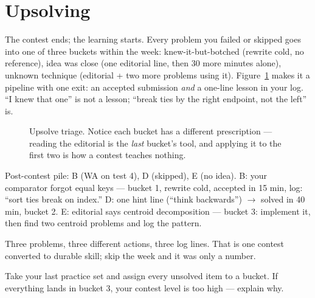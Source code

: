 \section{Upsolving}\label{sec:upsolve}
The contest ends; the learning starts. Every problem you
failed or skipped goes into one of three buckets within the
week: knew-it-but-botched (rewrite cold, no reference), idea
was close (one editorial line, then 30 more minutes alone),
unknown technique (editorial + two more problems using it).
Figure~\ref{fig:upsolve} makes it a pipeline with one exit:
an accepted submission \emph{and} a one-line lesson in your
log. ``I knew that one'' is not a lesson; ``break ties by the
right endpoint, not the left'' is.
\begin{figure}[ht]\centering

\caption{Upsolve triage. Notice each bucket has a different
prescription --- reading the editorial is the \emph{last}
bucket's tool, and applying it to the first two is how a
contest teaches nothing.}
\label{fig:upsolve}
\end{figure}

\begin{example}
Post-contest pile: B (WA on test 4), D (skipped), E (no idea).
B: your comparator forgot equal keys --- bucket 1, rewrite
cold, accepted in 15 min, log: ``sort ties break on index.''
D: one hint line (``think backwards'') $\to$ solved in 40 min,
bucket 2. E: editorial says centroid decomposition --- bucket
3: implement it, then find two centroid problems and log the
pattern.
\end{example}
\begin{solution}
Three problems, three different actions, three log lines.
That is one contest converted to durable skill; skip the week
and it was only a number.
\end{solution}

\begin{exercise}[easy] Take your last practice set and assign
every unsolved item to a bucket. If everything lands in
bucket 3, your contest level is too high --- explain
why.\end{exercise}

